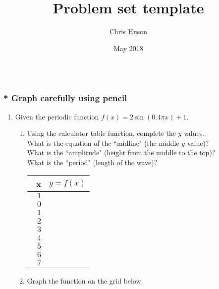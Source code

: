 \documentclass[12pt, oneside]{article}
\title{Problem set template}
\author{Chris Huson}
\date{May 2018}
\begin{document}

\subsubsection*{\\* \textnormal{Graph carefully using pencil}}

\begin{enumerate}

\item Given the periodic function $f(x)=2\sin (0.4 \pi x) +1$. 
\begin{enumerate}
    \item Using the calculator table function, complete the $y$ values.\\
    What is the equation of the ``midline" (the middle $y$ value)?\\ What is the ``amplitude" (height from the middle to the top)?\\ What is the ``period" (length of the wave)?\\
    \begin{tabular}{r|r}
    x & $y=f(x)$\\ 
    \hline 
    $-1$ & \\[5pt]
    $0$ & \\[5pt]
    $1$ & \\[5pt]
    $2$ & \\[5pt]
    $3$ & \\[5pt]
    $4$ & \\[5pt]
    $5$ & \\[5pt]
    $6$ & \\[5pt]
    $7$ & \\ 
    \end{tabular}
    \item Graph the function on the grid below.
\end{enumerate}
\begin{center}
\end{center}


\end{enumerate}
\end{document}
